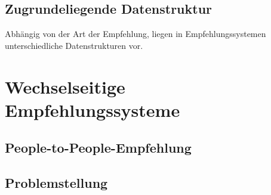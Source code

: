 \subsection{Zugrundeliegende Datenstruktur}
Abhängig von der Art der Empfehlung, liegen in Empfehlungssystemen unterschiedliche Datenstrukturen vor.


\section{Wechselseitige Empfehlungssysteme}
\label{ch:empfehlungssysteme:rrs}

\subsection{People-to-People-Empfehlung}
\label{ch:empfehlungssysteme:rrs:people_to_people}

\subsection{Problemstellung}

